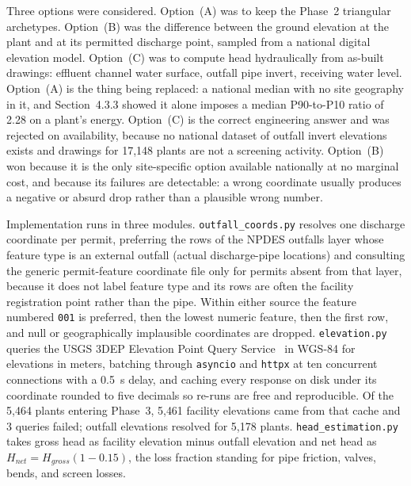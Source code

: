 \documentclass[12pt,letterpaper]{report}
\begin{document}
Three options were considered. Option~(A) was to keep the Phase~2 triangular
archetypes. Option~(B) was the difference between the ground elevation at the
plant and at its permitted discharge point, sampled from a national digital
elevation model. Option~(C) was to compute head hydraulically from as-built
drawings: effluent channel water surface, outfall pipe invert, receiving water
level. Option~(A) is the thing being replaced: a national median with no site
geography in it, and Section~4.3.3 showed it alone imposes a median P90-to-P10
ratio of 2.28 on a plant's energy. Option~(C) is the correct engineering answer
and was rejected on availability, because no national dataset of outfall invert
elevations exists and drawings for 17{,}148 plants are not a screening activity.
Option~(B) won because it is the only site-specific option available nationally
at no marginal cost, and because its failures are detectable: a wrong coordinate
usually produces a negative or absurd drop rather than a plausible wrong number.

Implementation runs in three modules. \texttt{outfall\_coords.py} resolves one
discharge coordinate per permit, preferring the rows of the NPDES outfalls layer
whose feature type is an external outfall (actual discharge-pipe locations)
and consulting the generic permit-feature coordinate file only for permits absent
from that layer, because it does not label feature type and its rows are often
the facility registration point rather than the pipe. Within either source the
feature numbered \texttt{001} is preferred, then the lowest numeric feature, then
the first row, and null or geographically implausible coordinates are dropped.
\texttt{elevation.py} queries the USGS 3DEP Elevation Point Query
Service~\cite{usgs_3dep} in WGS-84 for elevations in meters, batching through
\texttt{asyncio} and \texttt{httpx} at ten concurrent connections with a 0.5~s
delay, and caching every response on disk under its coordinate rounded to five
decimals so re-runs are free and reproducible. Of the 5{,}464 plants entering
Phase~3, 5{,}461 facility elevations came from that cache and 3 queries failed;
outfall elevations resolved for 5{,}178 plants. \texttt{head\_estimation.py} takes
gross head as facility elevation minus outfall elevation and net head as
$H_{net} = H_{gross}(1 - 0.15)$, the loss fraction standing for pipe friction,
valves, bends, and screen losses.
\end{document}
